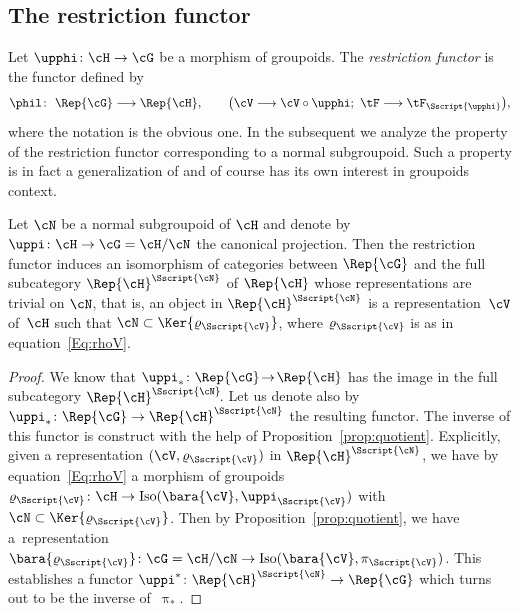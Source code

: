 \subsection{The restriction functor}\label{ssec:Res}
Let $\upphi\colon \cH \to \cG$ be a morphism of groupoids. The \emph{restriction functor} is the functor defined by
\begin{gather}\label{Eq:restriction}
\phil\colon \ \Rep{\cG} \longrightarrow \Rep{\cH}, \qquad \big( \cV\longrightarrow \cV \circ \upphi;\ \tF \longrightarrow\tF_{\Sscript{\upphi}} \big),
\end{gather}
where the notation is the obvious one. In the subsequent we analyze the property of the restriction functor corresponding to a normal subgroupoid. Such a property is in fact a generalization of \cite[Proposition~2.3.2]{Kowalski:2014} and of course has its own interest in groupoids context.

\begin{Proposition}\label{prop:Res} Let $\cN$ be a normal subgroupoid of $\cH$ and denote by $\uppi\colon \cH \to \cG=\cH/\cN$ the canonical projection. Then the restriction functor induces an isomorphism of categories between $\Rep{\cG}$ and the full subcategory $\Rep{\cH}^{\Sscript{\cN}}$ of $\Rep{\cH}$ whose representations are trivial on $\cN$, that is, an object in $\Rep{\cH}^{\Sscript{\cN}}$ is a representation~$\cV$ of~$\cH$ such that $\cN \subset \Ker{\varrho_{\Sscript{\cV}}}$, where $\varrho_{\Sscript{\cV}}$ is as in equation~\eqref{Eq:rhoV}.
\end{Proposition}
\begin{proof}We know that $\uppi_{*}\colon \Rep{\cG} \!\to\! \Rep{\cH}$ has the image in the full subcategory $\Rep{\cH}^{\Sscript{\cN}}\!$. Let us denote also by $\uppi_{*}\colon \Rep{\cG} \to \Rep{\cH}^{\Sscript{\cN}}$ the resulting functor. The inverse of this functor is construct with the help of Proposition~\ref{prop:quotient}. Explicitly, given a representation $(\cV, \varrho_{\Sscript{\cV}})$ in $\Rep{\cH}^{\Sscript{\cN}}$, we have by equation~\eqref{Eq:rhoV} a morphism of groupoids $\varrho_{\Sscript{\cV}}\colon \cH \to {\rm Iso}(\bara{\cV}, \uppi_{\Sscript{\cV}})$ with $\cN \subset \Ker{\varrho_{\Sscript{\cV}}}$. Then by Proposition~\ref{prop:quotient}, we have a~representation $\bara{\varrho_{\Sscript{\cV}}}\colon \cG=\cH/\cN \to {\rm Iso}(\bara{\cV}, \pi_{\Sscript{\cV}})$. This establishes a functor $\uppi^{*}\colon \Rep{\cH}^{\Sscript{\cN}} \to
\Rep{\cG}$ which turns out to be the inverse of~$\uppi_{*}$.
\end{proof}

